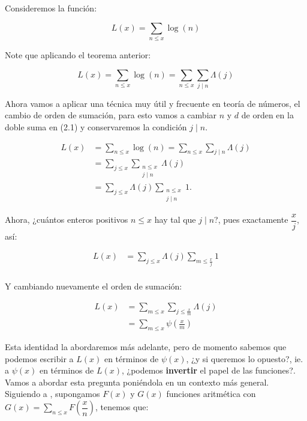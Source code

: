 Consideremos la función: 

$$L(x)=\sum_{n\leq x}\log(n)$$

Note que aplicando el teorema anterior:

\begin{equation}
L(x)=\sum_{n\leq x}\log(n)=\sum_{n\leq x}\sum_{j\mid n}\Lambda(j)
\end{equation}

Ahora vamos a aplicar una técnica muy útil y frecuente en teoría de números, el cambio de orden de sumación, para esto vamos a cambiar $n$ y $d$ de orden en la doble suma en (2.1) y conservaremos la condición $j\mid n$.

\begin{align*}
    L(x)&=\sum_{n\leq x}\log(n)=\sum_{n\leq x}\sum_{j\mid n}\Lambda(j)\\
    &=\sum_{j \leq x} \sum_{\substack{n \leq x \\
j \mid n}} \Lambda(j)\\
&=\sum_{j \leq x} \Lambda(j) \sum_{\substack{n \leq x \\
j \mid n}} 1
.\end{align*}

Ahora, ¿cuántos enteros positivos $n\leq x$ hay tal que $j\mid n$?, pues exactamente $\dfrac{x}{j}$, así:

\begin{align*}
    L(x)&=\sum_{j\leq x}\Lambda(j)\sum_{m\leq \frac{x}{j}}1\\
\end{align*}

Y cambiando nuevamente el orden de sumación:

\begin{align*}
    L(x)&=\sum_{m\leq x}\sum_{j\leq \frac{x}{m}}\Lambda(j)\\
    &=\sum_{m\leq x}\psi\left(\frac{x}{m}\right)
\end{align*}

Esta identidad la abordaremos más adelante, pero de momento sabemos que podemos escribir a $L(x)$ en términos de $\psi(x)$, ¿y si queremos lo opuesto?, ie. a $\psi(x)$ en términos de  $L(x)$, ¿podemos \textbf{invertir} el papel de las funciones?. Vamos a abordar esta pregunta poniéndola en un contexto más general.\\

Siguiendo a \cite{levinson1969motivated}, supongamos $F(x)$ y $G(x)$ funciones aritmética con $G(x)=\displaystyle\sum_{n\leq x}F\left(\dfrac{x}{n}\right)$, tenemos que:

